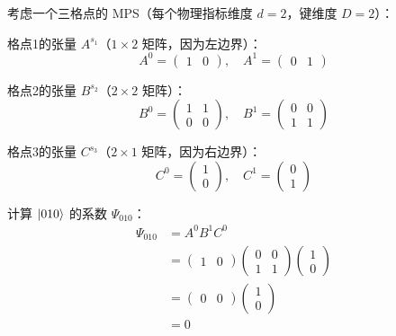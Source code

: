 \documentclass[12pt,a4paper]{ctexart}
\begin{document}
\begin{examplebox}
考虑一个三格点的 MPS（每个物理指标维度 $d=2$，键维度 $D=2$）：

格点1的张量 $A^{s_1}$（$1\times 2$ 矩阵，因为左边界）：
\[
A^{0} = \begin{pmatrix} 1 & 0 \end{pmatrix}, \quad A^{1} = \begin{pmatrix} 0 & 1 \end{pmatrix}
\]

格点2的张量 $B^{s_2}$（$2\times 2$ 矩阵）：
\[
B^{0} = \begin{pmatrix} 1 & 1 \\ 0 & 0 \end{pmatrix}, \quad B^{1} = \begin{pmatrix} 0 & 0 \\ 1 & 1 \end{pmatrix}
\]

格点3的张量 $C^{s_3}$（$2\times 1$ 矩阵，因为右边界）：
\[
C^{0} = \begin{pmatrix} 1 \\ 0 \end{pmatrix}, \quad C^{1} = \begin{pmatrix} 0 \\ 1 \end{pmatrix}
\]

计算 $\ket{010}$ 的系数 $\Psi_{010}$：
\begin{align}
\Psi_{010} &= A^0 B^1 C^0 \\
&= \begin{pmatrix} 1 & 0 \end{pmatrix}
\begin{pmatrix} 0 & 0 \\ 1 & 1 \end{pmatrix}
\begin{pmatrix} 1 \\ 0 \end{pmatrix} \\
&= \begin{pmatrix} 0 & 0 \end{pmatrix}
\begin{pmatrix} 1 \\ 0 \end{pmatrix} \\
&= 0
\end{align}


\end{examplebox}
\end{document}
